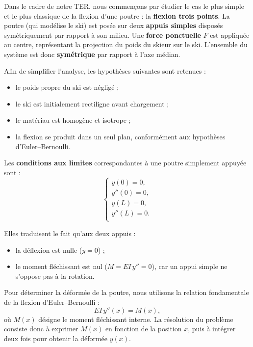 \documentclass[12pt, a4paper]{article}
\begin{document}
Dans le cadre de notre TER, nous commençons par étudier le cas le plus simple et le plus classique de la flexion d’une poutre : la \textbf{flexion trois points}. 
La poutre (qui modélise le ski) est posée sur deux \textbf{appuis simples} disposés symétriquement par rapport à son milieu. 
Une \textbf{force ponctuelle} $F$ est appliquée au centre, représentant la projection du poids du skieur sur le ski. 
L’ensemble du système est donc \textbf{symétrique} par rapport à l’axe médian.

\vspace{1em}

Afin de simplifier l’analyse, les hypothèses suivantes sont retenues :
\begin{itemize}
    \item le poids propre du ski est négligé ;
    \item le ski est initialement rectiligne avant chargement ;
    \item le matériau est homogène et isotrope ;
    \item la flexion se produit dans un seul plan, conformément aux hypothèses d’Euler–Bernoulli.
\end{itemize}

\vspace{1em}

Les \textbf{conditions aux limites} correspondantes à une poutre simplement appuyée sont :
\[
\begin{cases}
y(0) = 0, \\[4pt]
y''(0) = 0, \\[4pt]
y(L) = 0, \\[4pt]
y''(L) = 0. \\[4pt]
\end{cases}
\]

Elles traduisent le fait qu’aux deux appuis : 
\begin{itemize}
    \item la déflexion est nulle ($y=0$) ;
    \item le moment fléchissant est nul ($M=EI\,y''=0$), car un appui simple ne s’oppose pas à la rotation.
\end{itemize}

Pour déterminer la déformée de la poutre, nous utilisons la relation fondamentale de la
flexion d’Euler–Bernoulli :
\[
EI\,y''(x) = M(x),
\]
où $M(x)$ désigne le moment fléchissant interne. 
La résolution du problème consiste donc à exprimer $M(x)$ en fonction de la position $x$,
puis à intégrer deux fois pour obtenir la déformée $y(x)$.
\end{document}
